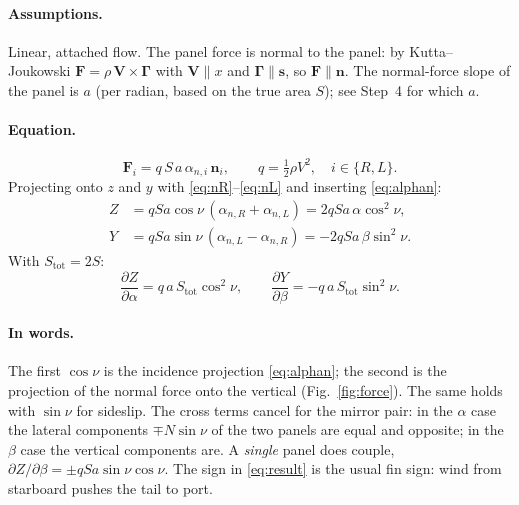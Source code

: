 \documentclass[11pt,a4paper]{article}
\newcommand{\vect}[1]{\mathbf{#1}}
\begin{document}
\paragraph{Assumptions.} Linear, attached flow. The panel force is normal to the panel:
by Kutta--Joukowski $\vect{F}=\rho\,\vect{V}\times\vect{\Gamma}$ with $\vect{V}\parallel x$ and
$\vect{\Gamma}\parallel\vect{s}$, so $\vect{F}\parallel\vect{n}$. The normal-force slope of the panel
is $a$ (per radian, based on the true area $S$); see Step~4 for which $a$.

\paragraph{Equation.}
\begin{equation}
  \vect{F}_i = q\,S\,a\,\alpha_{n,i}\,\vect{n}_i ,\qquad q=\tfrac12\rho V^2,\quad i\in\{R,L\}.
  \label{eq:force}
\end{equation}
Projecting onto $z$ and $y$ with \eqref{eq:nR}--\eqref{eq:nL} and inserting \eqref{eq:alphan}:
\begin{align}
  Z &= qSa\cos\nu\,(\alpha_{n,R}+\alpha_{n,L}) = 2qSa\,\alpha\cos^2\nu, \label{eq:Z}\\
  Y &= qSa\sin\nu\,(\alpha_{n,L}-\alpha_{n,R}) = -2qSa\,\beta\sin^2\nu. \label{eq:Y}
\end{align}
With $S_\mathrm{tot}=2S$:
\begin{equation}
  \boxed{\frac{\partial Z}{\partial\alpha} = q\,a\,S_\mathrm{tot}\cos^2\nu,\qquad
         \frac{\partial Y}{\partial\beta} = -q\,a\,S_\mathrm{tot}\sin^2\nu.} \label{eq:result}
\end{equation}

\paragraph{In words.} The first $\cos\nu$ is the incidence projection \eqref{eq:alphan}; the second
is the projection of the normal force onto the vertical (Fig.~\ref{fig:force}). The same holds with
$\sin\nu$ for sideslip. The cross terms cancel for the mirror pair: in the $\alpha$ case the lateral
components $\mp N\sin\nu$ of the two panels are equal and opposite; in the $\beta$ case the vertical
components are. A \emph{single} panel does couple, $\partial Z/\partial\beta = \pm qSa\sin\nu\cos\nu$.
The sign in \eqref{eq:result} is the usual fin sign: wind from starboard pushes the tail to port.
\end{document}
